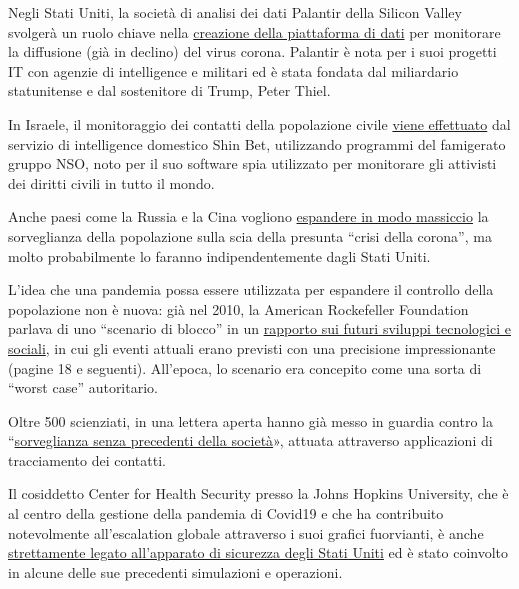 Negli Stati Uniti, la società di analisi dei dati Palantir della Silicon
Valley svolgerà un ruolo chiave nella
\href{https://www.msn.com/en-us/news/us/team-trump-turns-to-peter-thiel-s-palantir-to-track-virus/ar-BB130qfE}{creazione
della piattaforma di dati} per monitorare la diffusione (già in declino)
del virus corona. Palantir è nota per i suoi progetti IT con agenzie di
intelligence e militari ed è stata fondata dal miliardario statunitense
e dal sostenitore di Trump, Peter Thiel.

In Israele, il monitoraggio dei contatti della popolazione civile
\href{https://www.techdirt.com/articles/20200402/14261944226/controversial-spyware-vendor-nso-group-is-helping-israeli-government-spy-own-citizens.shtml}{viene
effettuato} dal servizio di intelligence domestico Shin Bet, utilizzando
programmi del famigerato gruppo NSO, noto per il suo software spia
utilizzato per monitorare gli attivisti dei diritti civili in tutto il
mondo.

Anche paesi come la Russia e la Cina vogliono
\href{https://www.npr.org/sections/coronavirus-live-updates/2020/04/01/825329399/moscow-launches-new-surveillance-app-to-track-residents-in-coronavirus-lockdown}{espandere
in modo massiccio} la sorveglianza della popolazione sulla scia della
presunta ``crisi della corona'', ma molto probabilmente lo faranno
indipendentemente dagli Stati Uniti.

L'idea che una pandemia possa essere utilizzata per espandere il
controllo della popolazione non è nuova: già nel 2010, la American
Rockefeller Foundation parlava di uno ``scenario di blocco'' in un
\href{https://swprs.files.wordpress.com/2020/04/rockefeller-foundation-scenarios-2010.pdf}{rapporto
sui futuri sviluppi tecnologici e sociali}, in cui gli eventi attuali
erano previsti con una precisione impressionante (pagine 18 e seguenti).
All'epoca, lo scenario era concepito come una sorta di ``worst case''
autoritario.

Oltre 500 scienziati, in una lettera aperta hanno già messo in guardia
contro la
``\href{https://www.esat.kuleuven.be/cosic/sites/contact-tracing-joint-statement/}{sorveglianza
senza precedenti della società}», attuata attraverso applicazioni di
tracciamento dei contatti.

Il cosiddetto Center for Health Security presso la Johns Hopkins
University, che è al centro della gestione della pandemia di Covid19 e
che ha contribuito notevolmente all'escalation globale attraverso i suoi
grafici fuorvianti, è anche
\href{http://unlimitedhangout.com/2020/04/investigative-series/all-roads-lead-to-dark-winter/}{strettamente
legato all'apparato di sicurezza degli Stati Uniti} ed è stato coinvolto
in alcune delle sue precedenti simulazioni e operazioni.


